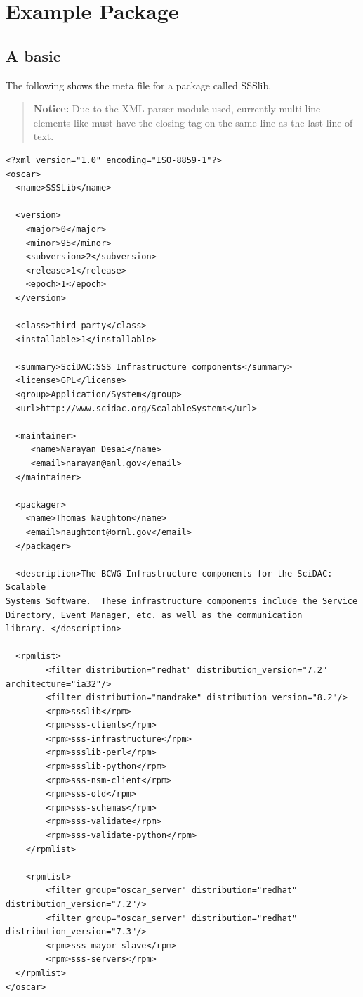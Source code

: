 
\section{Example Package}
\label{sect:example-pkg}

\subsection{A basic }
\label{sect:example-config-xml}

The following shows the meta file for a package called SSSlib.  

\begin{verse}
   {\bfseries Notice: } Due to the XML parser module used, currently
   multi-line elements like  must have the closing tag
   on the same line as the last line of text.  
\end{verse}


\begin{scriptsize}
\begin{verbatim}
<?xml version="1.0" encoding="ISO-8859-1"?>
<oscar>
  <name>SSSLib</name>

  <version>
    <major>0</major>
    <minor>95</minor>
    <subversion>2</subversion>
    <release>1</release>
    <epoch>1</epoch>
  </version>

  <class>third-party</class>
  <installable>1</installable>

  <summary>SciDAC:SSS Infrastructure components</summary>
  <license>GPL</license>
  <group>Application/System</group>
  <url>http://www.scidac.org/ScalableSystems</url>
  
  <maintainer>
     <name>Narayan Desai</name>
     <email>narayan@anl.gov</email>
  </maintainer>

  <packager>
    <name>Thomas Naughton</name>
    <email>naughtont@ornl.gov</email>
  </packager>

  <description>The BCWG Infrastructure components for the SciDAC: Scalable 
Systems Software.  These infrastructure components include the Service 
Directory, Event Manager, etc. as well as the communication 
library. </description>

  <rpmlist>
        <filter distribution="redhat" distribution_version="7.2" architecture="ia32"/>
        <filter distribution="mandrake" distribution_version="8.2"/>
        <rpm>ssslib</rpm>
        <rpm>sss-clients</rpm>
        <rpm>sss-infrastructure</rpm>
        <rpm>ssslib-perl</rpm>
        <rpm>ssslib-python</rpm>
        <rpm>sss-nsm-client</rpm>
        <rpm>sss-old</rpm>
        <rpm>sss-schemas</rpm>
        <rpm>sss-validate</rpm>
        <rpm>sss-validate-python</rpm>
	</rpmlist>

	<rpmlist>
        <filter group="oscar_server" distribution="redhat" distribution_version="7.2"/>
        <filter group="oscar_server" distribution="redhat" distribution_version="7.3"/>
        <rpm>sss-mayor-slave</rpm>
        <rpm>sss-servers</rpm>
  </rpmlist>
</oscar>
\end{verbatim}
\end{scriptsize}


